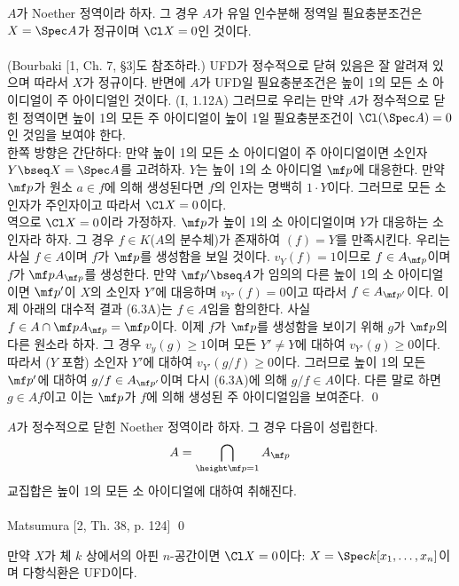 	
	\begin{proposition}
	$A$가 Noether 정역이라 하자. 그 경우 $A$가 유일 인수분해 정역일 필요충분조건은 $X=\Spec A$가 정규이며 $\Cl X=0$인 것이다.\\\\
	\pf (Bourbaki [1, Ch. 7, \S 3]도 참조하라.) UFD가 정수적으로 닫혀 있음은 잘 알려져 있으며 따라서 $X$가 정규이다.
	반면에 $A$가 UFD일 필요충분조건은 높이 1의 모든 소 아이디얼이 주 아이디얼인 것이다. (I, 1.12A)
	그러므로 우리는 만약 $A$가 정수적으로 닫힌 정역이면 높이 1의 모든 주 아이디얼이 높이 1일 필요충분조건이
	$\Cl(\Spec A)=0$인 것임을 보여야 한다.\\
	한쪽 방향은 간단하다: 만약 높이 1의 모든 소 아이디얼이 주 아이디얼이면 소인자 $Y\bseq X=\Spec A$를 고려하자.
	$Y$는 높이 1의 소 아이디얼 $\mf p$에 대응한다. 만약 $\mf p$가 원소 $a\in f$에 의해 생성된다면 $f$의 인자는 명백히 $1\cdot Y$이다.
	그러므로 모든 소인자가 주인자이고 따라서 $\Cl X=0$이다.\\
	역으로 $\Cl X=0$이라 가정하자. $\mf p$가 높이 1의 소 아이디얼이며 $Y$가 대응하는 소인자라 하자.
	그 경우 $f\in K$($A$의 분수체)가 존재하여 $(f)=Y$를 만족시킨다. 우리는 사실 $f\in A$이며 $f$가 $\mf p$를 생성함을 보일 것이다.
	$v_Y(f)=1$이므로 $f\in A_{\mf p}$이며 $f$가 $\mf pA_{\mf p}$를 생성한다.
	만약 $\mf p'\bseq A$가 임의의 다른 높이 1의 소 아이디얼이면
	$\mf p'$이 $X$의 소인자 $Y'$에 대응하며 $v_{Y'}(f)=0$이고 따라서 $f\in A_{\mf p'}$이다.
	이제 아래의 대수적 결과 (6.3A)는 $f\in A$임을 함의한다. 사실 $f\in A\cap\mf pA_{\mf p}=\mf p$이다.
	이제 $f$가 $\mf p$를 생성함을 보이기 위해 $g$가 $\mf p$의 다른 원소라 하자.
	그 경우 $v_y(g)\ge 1$이며 모든 $Y'\ne Y$에 대하여 $v_{Y'}(g)\ge 0$이다.
	따라서 ($Y$ 포함) 소인자 $Y'$에 대하여 $v_{Y'}(g/f)\ge 0$이다.
	그러므로 높이 1의 모든 $\mf p'$에 대하여 $g/f\in A_{\mf p'}$이며 다시 (6.3A)에 의해 $g/f\in A$이다.
	다른 말로 하면 $g\in Af$이고 이는 $\mf p$가 $f$에 의해 생성된 주 아이디얼임을 보여준다.
	\qed
	\end{proposition}
	
	
	\begin{propositiona}
	$A$가 정수적으로 닫힌 Noether 정역이라 하자. 그 경우 다음이 성립한다.
	$$A=\bigcap_{\height\mf p=1}A_{\mf p}$$
	교집합은 높이 1의 모든 소 아이디얼에 대하여 취해진다.\\\\
	\pf Matsumura [2, Th. 38, p. 124]
	\qed
	\end{propositiona}
	
	
	\begin{example}
	만약 $X$가 체 $k$ 상에서의 아핀 $n$-공간이면 $\Cl X=0$이다: $X=\Spec k[x_1,\ldots,x_n]$이며 다항식환은 UFD이다.
	\end{example}
	
